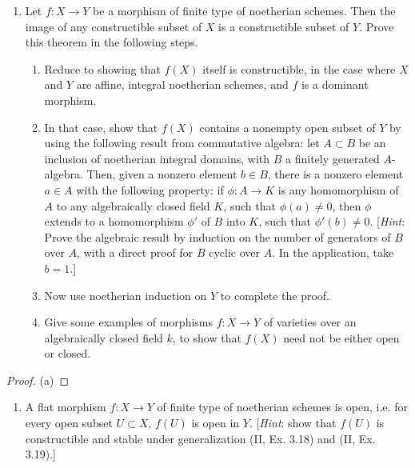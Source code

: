 \documentclass[12pt]{amsart}
\begin{document}
\begin{enumerate}
  \item[II.3.19] {
      Let $f:X\to Y$ be a morphism of finite type of noetherian schemes.
      Then the image of any constructible subset of $X$ is a constructible subset of $Y$.
      Prove this theorem in the following steps.
      \begin{enumerate}
        \item Reduce to showing that $f(X)$ itself is constructible, in the case where $X$ and $Y$ are affine, integral noetherian schemes, and $f$ is a dominant morphism.
        \item In that case, show that $f(X)$ contains a nonempty open subset of $Y$ by using the following result from commutative algebra:
          let $A\subset B$ be an inclusion of noetherian integral domains, with $B$ a finitely generated $A$-algebra.
          Then, given a nonzero element $b\in B$, there is a nonzero element $a\in A$ with the following property: if $\phi:A\to K$ is any homomorphism of $A$ to any algebraically closed field $K$, such that $\phi(a)\neq 0$, then $\phi$ extends to a homomorphism $\phi'$ of $B$ into $K$, such that $\phi'(b)\neq 0$.
          [\emph{Hint}: Prove the algebraic result by induction on the number of generators of $B$ over $A$, with a direct proof for $B$ cyclic over $A$. In the application, take $b=1$.]
        \item Now use noetherian induction on $Y$ to complete the proof.
        \item Give some examples of morphisms $f:X\to Y$ of varieties over an algebraically closed field $k$, to show that $f(X)$ need not be either open or closed.
      \end{enumerate}
    }
\end{enumerate}

\begin{proof}
  (a)
\end{proof}

\begin{enumerate}
  \item[9.1.] {
      A flat morphism $f:X\to Y$ of finite type of noetherian schemes is open, i.e. for every open subset $U\subset X$, $f(U)$ is open in $Y$.
      [\emph{Hint}: show that $f(U)$ is constructible and stable under generalization (II, Ex. 3.18) and (II, Ex. 3.19).]
    }
\end{enumerate}
\end{document}
